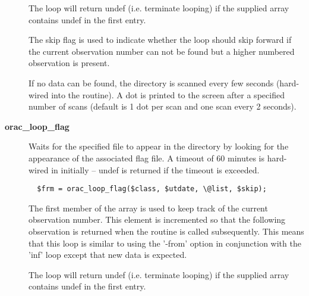 \begin{description}
The loop will return undef (i.e. terminate looping) if the
supplied array contains undef in the first entry.



The skip flag is used to indicate whether the loop should skip
forward if the current observation number can not be found
but a higher numbered observation is present.



If no data can be found, the directory is scanned every few seconds
(hard-wired into the routine). A dot is printed to the screen after
a specified number of scans (default is 1 dot per scan and one scan every
2 seconds).

\item[\textbf{orac\_loop\_flag}] \mbox{}

Waits for the specified file to appear in the directory
by looking for the appearance of the associated flag file.
A timeout of 60 minutes is hard-wired in initially -- undef
is returned if the timeout is exceeded.

\begin{verbatim}
  $frm = orac_loop_flag($class, $utdate, \@list, $skip);
\end{verbatim}


The first member of the array is used to keep track of the
current observation number. This element is incremented so that
the following observation is returned when the routine is called
subsequently. This means that this loop is similar to using the
'-from' option in conjunction with the 'inf' loop except that
new data is expected.



The loop will return undef (i.e. terminate looping) if the
supplied array contains undef in the first entry.

\end{description}
